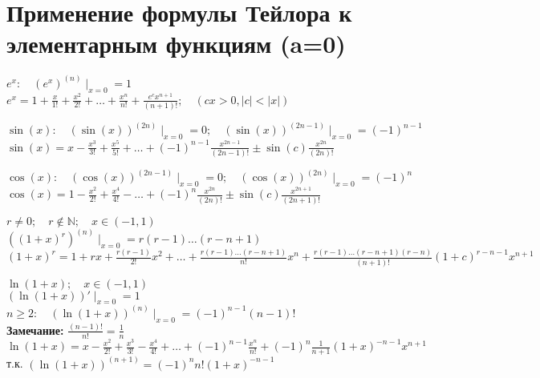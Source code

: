 \section{Применение формулы Тейлора к элементарным функциям (a=0)}
\begin{properties}
	$e^{x}: \quad (e^{x})^{(n)}\mid_{x=0}=1$ \\
	$e^{x}=1+\displaystyle\frac{x}{1!}+\displaystyle\frac{x^2}{2!}+\ldots+\displaystyle\frac{x^{n}}{n!}+\displaystyle\frac{e^{c}x^{n+1}}{(n+1)!}; \quad (cx>0, |c|<|x|)$
\end{properties}
\begin{properties}
	$\sin (x): \quad (\sin (x))^{(2n)}\mid_{x=0}=0; \quad (\sin (x))^{(2n-1)}\mid_{x=0}=(-1)^{n-1}$ \\
	$\sin (x)=x-\displaystyle\frac{x^{3}}{3!}+\displaystyle\frac{x^{5}}{5!}+\ldots+ (-1)^{n-1}\displaystyle\frac{x^{2n-1}}{(2n-1)!}\pm \sin (c)\displaystyle\frac{x^{2n}}{(2n)!}$
\end{properties}
\begin{properties}
	$\cos (x): \quad (\cos (x))^{(2n-1)}\mid_{x=0}=0; \quad (\cos (x))^{(2n)}\mid_{x=0}=(-1)^{n}$ \\
	$\cos (x)=1-\displaystyle\frac{x^2}{2!}+\displaystyle\frac{x^{4}}{4!}-\ldots+(-1)^{n}\displaystyle\frac{x^{2n}}{(2n)!} \pm \sin (c)\displaystyle\frac{x^{2n+1}}{(2n+1)!}$
\end{properties}
\begin{properties}
	$r \neq 0; \quad r \not\in \mathbb{N}; \quad x \in (-1,1)$\\
	$((1+x)^{r})^{(n)}\mid_{x=0}=r(r-1)\ldots(r-n+1)$\\
	$(1+x)^{r}=1+rx+\displaystyle\frac{r(r-1)}{2!}x^2+\ldots+\displaystyle\frac{r(r-1)\ldots(r-n+1)}{n!}x^{n}+\displaystyle\frac{r(r-1)\ldots(r-n+1)(r-n)}{(n+1)!}(1+c)^{r-n-1}x^{n+1}$
\end{properties}
\begin{properties}
	$\ln (1+x); \quad x \in (-1,1)$ \\
	$(\ln (1+x))'\mid_{x=0}=1$\\
	$n\ge 2: \quad (\ln {(1+x)})^{(n)}\mid_{x=0}=(-1)^{n-1}(n-1)!$ \\
	\textbf{Замечание:} $\displaystyle\frac{(n-1)!}{n!}=\displaystyle\frac{1}{n}$ \\
	 $\ln {(1+x)}=x-\displaystyle\frac{x^2}{2!}+\displaystyle\frac{x^{3}}{3!}-\displaystyle\frac{x^{4}}{4!}+\ldots+(-1)^{n-1}\displaystyle\frac{x^{n}}{n!}+(-1)^{n}\displaystyle\frac{1}{n+1}(1+x)^{-n-1}x^{n+1}$ \\
	 т.к. $(\ln {(1+x)})^{(n+1)}=(-1)^{n}n!(1+x)^{-n-1}$
\end{properties}